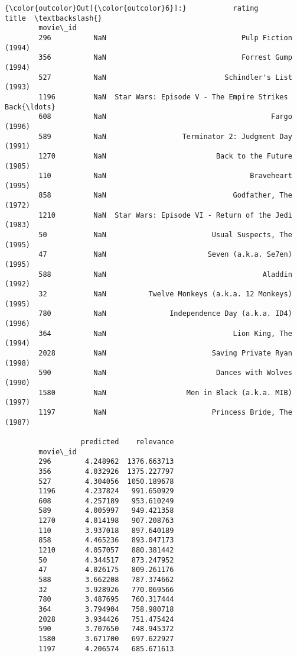 \documentclass[11pt]{article}
\begin{document}
\begin{Verbatim}[commandchars=\\\{\}]
{\color{outcolor}Out[{\color{outcolor}6}]:}           rating                                              title  \textbackslash{}
        movie\_id
        296          NaN                                Pulp Fiction (1994)
        356          NaN                                Forrest Gump (1994)
        527          NaN                            Schindler's List (1993)
        1196         NaN  Star Wars: Episode V - The Empire Strikes Back{\ldots}
        608          NaN                                       Fargo (1996)
        589          NaN                  Terminator 2: Judgment Day (1991)
        1270         NaN                          Back to the Future (1985)
        110          NaN                                  Braveheart (1995)
        858          NaN                              Godfather, The (1972)
        1210         NaN  Star Wars: Episode VI - Return of the Jedi (1983)
        50           NaN                         Usual Suspects, The (1995)
        47           NaN                        Seven (a.k.a. Se7en) (1995)
        588          NaN                                     Aladdin (1992)
        32           NaN          Twelve Monkeys (a.k.a. 12 Monkeys) (1995)
        780          NaN               Independence Day (a.k.a. ID4) (1996)
        364          NaN                              Lion King, The (1994)
        2028         NaN                         Saving Private Ryan (1998)
        590          NaN                          Dances with Wolves (1990)
        1580         NaN                   Men in Black (a.k.a. MIB) (1997)
        1197         NaN                         Princess Bride, The (1987)

                  predicted    relevance
        movie\_id
        296        4.248962  1376.663713
        356        4.032926  1375.227797
        527        4.304056  1050.189678
        1196       4.237824   991.650929
        608        4.257189   953.610249
        589        4.005997   949.421358
        1270       4.014198   907.208763
        110        3.937018   897.640189
        858        4.465236   893.047173
        1210       4.057057   880.381442
        50         4.344517   873.247952
        47         4.026175   809.261176
        588        3.662208   787.374662
        32         3.928926   770.069566
        780        3.487695   760.317444
        364        3.794904   758.980718
        2028       3.934426   751.475424
        590        3.707650   748.945372
        1580       3.671700   697.622927
        1197       4.206574   685.671613
\end{Verbatim}
\end{document}
